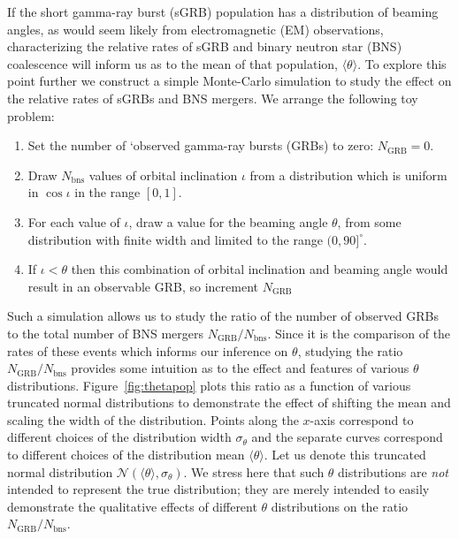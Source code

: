 \documentclass[twocolumn,nofootinbib]{revtex4-1}
\def\bns#1{binary neutron star#1 (BNS#1)\gdef\bns{BNS}}
\def\grb#1{gamma-ray burst#1 (GRB#1)\gdef\grb{GRB}}
\def\sgrb#1{short gamma-ray burst#1 (sGRB#1)\gdef\sgrb{sGRB}}
\def\electro#1{electromagnetic#1 (EM#1)\gdef\electro{EM}}
\begin{document}
If the \sgrb{} population has a distribution of beaming angles, as would seem
likely from \electro{} observations, characterizing the relative rates of
\sgrb{} and \bns{} coalescence will inform us as to the mean of that population,
$\langle \theta \rangle$.  To explore this point further we construct a simple
Monte-Carlo simulation to study the effect on the relative rates of \sgrb{s} and
\bns{} mergers.  We arrange the following toy problem:
%
\begin{enumerate}
    \item Set the number of `observed \grb{s} to zero: $N_{\mathrm{GRB}}=0$.
    \item Draw $N_{\mathrm{bns}}$ values of orbital inclination $\iota$ from a
        distribution which is uniform in $\cos \iota$ in the range $[0,1]$.
    \item For each value of $\iota$, draw a value for the beaming angle
    $\theta$, from some distribution with finite width and limited to the range
$(0,90]^{\circ}$.  
    \item If $\iota<\theta$ then this combination of orbital inclination and
        beaming angle would result in an observable \grb{}, so increment
        $N_{\mathrm{GRB}}$
\end{enumerate}
%
Such a simulation allows us to study the ratio of the number of observed
\grb{s} to the total number of \bns{} mergers $N_{\mathrm{GRB}}/
N_{\mathrm{bns}}$.  Since it is the comparison of the rates of these events
which informs our inference on $\theta$,  studying the ratio $N_{\mathrm{GRB}}
/N_{\mathrm{bns}}$ provides some intuition as to the effect and features of
various $\theta$ distributions.  Figure~\ref{fig:thetapop} plots this ratio as a
function of various truncated normal distributions to demonstrate the effect of
shifting the mean and scaling the width of the distribution. Points along the
$x$-axis correspond to different choices of the distribution width
$\sigma_{\theta}$ and the
separate curves correspond to different choices of the distribution mean
$\langle \theta \rangle$.  Let us denote this truncated normal distribution
${\mathcal N}(\langle \theta \rangle, \sigma_{\theta})$.  We
stress here that such $\theta$ distributions are \emph{not} intended to
represent the true distribution; they are merely intended to easily
demonstrate the qualitative effects of different $\theta$ distributions on the
ratio $N_{\mathrm{GRB}}/N_{\mathrm{bns}}$.
 
\end{document}
